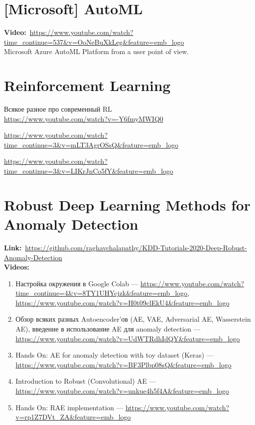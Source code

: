
\section*{[Microsoft] AutoML}
\textbf{Video:}~\url{https://www.youtube.com/watch?time_continue=537&v=OoNeBuXkLeg&feature=emb_logo} \\

Microsoft Azure AutoML Platform from a user point of view.


\section*{Reinforcement Learning}

Всякое разное про современный RL \\

\url{https://www.youtube.com/watch?v=-Y6fmyMWIQ0}

\url{https://www.youtube.com/watch?time_continue=3&v=mLT3AgrOSsQ&feature=emb_logo}

\url{https://www.youtube.com/watch?time_continue=3&v=LIKrJnCo5fY&feature=emb_logo}


\section*{Robust Deep Learning Methods for Anomaly Detection} 

\textbf{Link:}~\url{https://github.com/raghavchalapathy/KDD-Tutorials-2020-Deep-Robust-Anomaly-Detection} \\

\textbf{Videos:}

\begin{enumerate}
    \item Настройка окружения в Google Colab --- \url{https://www.youtube.com/watch?time_continue=4&v=8TY1UHYcjzk&feature=emb_logo}, \url{https://www.youtube.com/watch?v=H0t09clEkU4&feature=emb_logo}
    \item Обзор всяких разных Autoencoder'ов (AE, VAE, Adversarial AE, Wasserstein AE), введение в использование AE для anomaly detection --- \url{https://www.youtube.com/watch?v=UdWTRdhIdQY&feature=emb_logo}
    \item Hands On: AE for anomaly detection with toy dataset (Keras) --- \url{https://www.youtube.com/watch?v=BF3Plbp08sQ&feature=emb_logo}
    \item Introduction to Robust (Convolutional) AE --- \url{https://www.youtube.com/watch?v=unkue4h5f4A&feature=emb_logo}
    \item Hands On: RAE implementation --- \url{https://www.youtube.com/watch?v=rp1Z7DVt_ZA&feature=emb_logo}
\end{enumerate}
